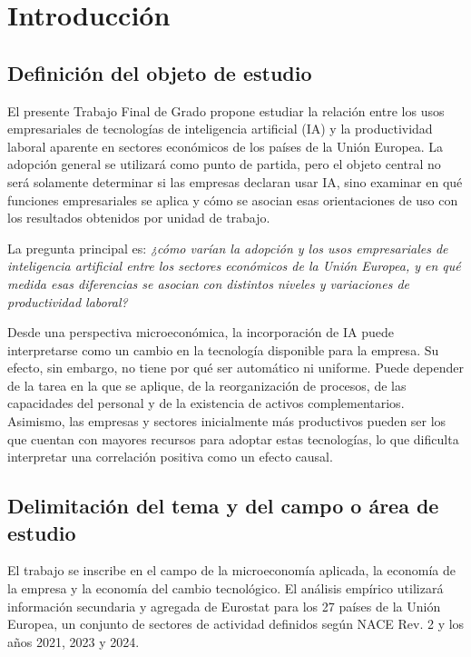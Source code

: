 \documentclass[12pt,a4paper]{article}
\begin{document}
\section{Introducción}

\subsection{Definición del objeto de estudio}

El presente Trabajo Final de Grado propone estudiar la relación entre los usos empresariales de tecnologías de inteligencia artificial (IA) y la productividad laboral aparente en sectores económicos de los países de la Unión Europea. La adopción general se utilizará como punto de partida, pero el objeto central no será solamente determinar si las empresas declaran usar IA, sino examinar en qué funciones empresariales se aplica y cómo se asocian esas orientaciones de uso con los resultados obtenidos por unidad de trabajo.

La pregunta principal es: \textit{¿cómo varían la adopción y los usos empresariales de inteligencia artificial entre los sectores económicos de la Unión Europea, y en qué medida esas diferencias se asocian con distintos niveles y variaciones de productividad laboral?}

Desde una perspectiva microeconómica, la incorporación de IA puede interpretarse como un cambio en la tecnología disponible para la empresa. Su efecto, sin embargo, no tiene por qué ser automático ni uniforme. Puede depender de la tarea en la que se aplique, de la reorganización de procesos, de las capacidades del personal y de la existencia de activos complementarios. Asimismo, las empresas y sectores inicialmente más productivos pueden ser los que cuentan con mayores recursos para adoptar estas tecnologías, lo que dificulta interpretar una correlación positiva como un efecto causal.

\subsection{Delimitación del tema y del campo o área de estudio}

El trabajo se inscribe en el campo de la microeconomía aplicada, la economía de la empresa y la economía del cambio tecnológico. El análisis empírico utilizará información secundaria y agregada de Eurostat para los 27 países de la Unión Europea, un conjunto de sectores de actividad definidos según NACE Rev. 2 y los años 2021, 2023 y 2024.
\end{document}

